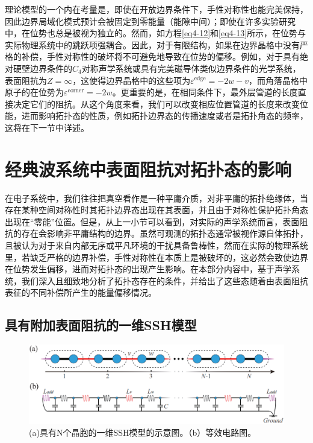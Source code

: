 理论模型的一个内在考量是，即使在开放边界条件下，手性对称性也能完美保持，因此边界局域化模式预计会被固定到零能量（能隙中间）；即使在许多实验研究中，在位势也总是被视为独立的。然而，如方程\ref{eq4-12}和\ref{eq4-13}所示，在位势与实际物理系统中的跳跃项强耦合。因此，对于有限结构，如果在边界晶格中没有严格的补偿，手性对称性的破坏将不可避免地导致在位势的偏移。例如，对于具有绝对硬壁边界条件的$C_4$对称声学系统或具有完美磁导体类似边界条件的光学系统，表面阻抗为$Z = \infty$，这使得边界晶格中的这些项为$\varepsilon^{\text{edge}} = -2w - v$，而角落晶格中原子的在位势为$\varepsilon^{\text{corner}} = -2w$。更重要的是，在相同条件下，最外层管道的长度直接决定它们的阻抗。从这个角度来看，我们可以改变相应位置管道的长度来改变位能，进而影响拓扑态的性质，例如拓扑边界态的传播速度或者是拓扑角态的频率，这将在下一节中详述。

\section{经典波系统中表面阻抗对拓扑态的影响}

在电子系统中，我们往往把真空看作是一种平庸介质，对非平庸的拓扑绝缘体，当存在某种空间对称性时其拓扑边界态出现在其表面，并且由于对称性保护拓扑角态出现在“零能”位置。但是，从上一小节可以看到，对实际的声学系统而言，表面阻抗的存在会影响非平庸结构的边界。虽然可观测的拓扑态通常被视作源自体拓扑，且被认为对于来自内部无序或平凡环境的干扰具备鲁棒性，然而在实际的物理系统里，若缺乏严格的边界补偿，手性对称性在本质上是被破坏的，这必然会致使边界在位势发生偏移，进而对拓扑态的出现产生影响。在本部分内容中，基于声学系统，我们深入且细致地分析了拓扑态存在的条件，并给出了这些态随着由表面阻抗表征的不同补偿所产生的能量偏移情况。 

\subsection{具有附加表面阻抗的一维SSH模型}

\begin{figure}[h!]
    \centering
    \includegraphics[width=1\textwidth]{images/fig4-3.eps} 
    \caption{(a)具有N个晶胞的一维SSH模型的示意图。（b）等效电路图。}
    \label{fig_4_3}
  \end{figure}  

